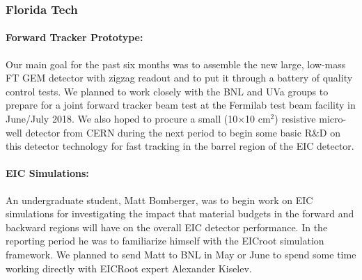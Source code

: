 \subsubsection{Florida Tech} 
\paragraph*{Forward Tracker Prototype:} Our main goal for the past six months was to assemble the new large, low-mass FT GEM detector with zigzag readout and to put it through a battery of quality control tests. We planned to work closely with the BNL and UVa groups to prepare for a joint forward tracker beam test at the Fermilab test beam facility in June/July 2018. We also hoped to procure a small (10$\times$10 cm$^2$) resistive micro-well detector from CERN during the next period to begin some basic R\&D on this detector technology for fast tracking in the barrel region of the EIC detector.

\paragraph*{EIC Simulations:} An undergraduate student, Matt Bomberger, was to begin work on EIC simulations for investigating the impact that material budgets in the forward and backward regions will have on the overall EIC detector performance. In the reporting period he was to familiarize himself with the EICroot simulation framework. We planned to send Matt to BNL in May or June to spend some time working directly with EICRoot expert Alexander Kiselev.
